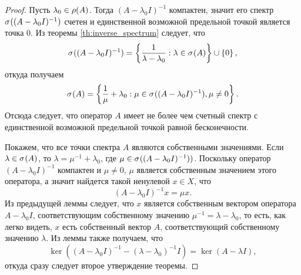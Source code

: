 \begin{proof}
    Пусть $\lambda_0 \in \operatorname{\rho}(A)$. Тогда $(A - \lambda_0 I)^{-1}$ компактен, значит его спектр
    $\spectrum{(A - \lambda_0 I)^{-1}}$ счетен и единственной возможной предельной точкой является
    точка $0$. Из теоремы \ref{th:inverse_spectrum} следует, что
    \[ \spectrum{(A- \lambda_0 I)^{-1}} = \menge{\frac{1}{\lambda - \lambda_0} : \lambda \in 
        \spectrum{A}} \cup \menge{0},\]
    откуда получаем 
    \[ \spectrum{A} = \menge{\frac{1}{\mu} + \lambda_0 : \mu \in 
        \spectrum{(A- \lambda_0 I)^{-1}}, \mu \neq 0}. \]
    Отсюда следует, что оператор $A$ имеет не более чем счетный спектр с единственной
    возможной предельной точкой равной бесконечности.

    Покажем, что все точки спектра $A$ являются собственными значениями.
    Если $\lambda \in \spectrum{A}$, то $\lambda = \mu^{-1} + \lambda_0$, где 
    $\mu \in \spectrum{(A - \lambda_0 I)^{-1})}$. Поскольку оператор $(A - \lambda_0 I)^{-1}$ 
    компактен и $\mu \neq 0$, $\mu$ является собственным значением этого оператора, а значит
    найдется такой ненулевой $x \in X$, что
    \[ (A - \lambda_0 I)^{-1} x = \mu x. \]
    Из предыдущей леммы следует, что $x$ является собственным вектором оператора $A - \lambda_0 I$,
    соответствующим собственному значению $\mu^{-1} = \lambda - \lambda_0$, то есть, как легко 
    видеть, $x$ есть собственный вектор $A$, соответствующий собственному значению $\lambda$.
    Из леммы также получаем, что 
    \[ \ker((A - \lambda_0 I)^{-1} - (\lambda - \lambda_0)^{-1} I) = \ker(A - \lambda I), \]
    откуда сразу следует второе утверждение теоремы.
\end{proof}
